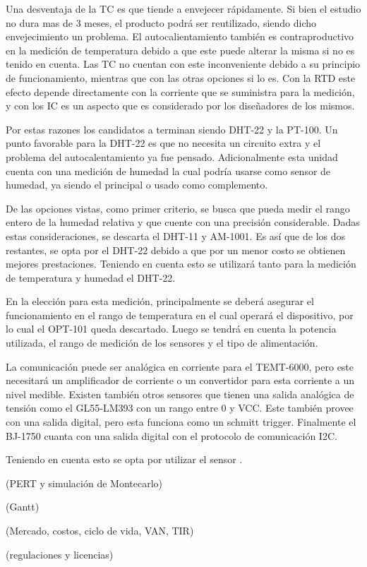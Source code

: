 Una desventaja de la TC es que tiende a envejecer rápidamente. Si bien el estudio no dura mas de 3 meses, el producto podrá ser reutilizado, siendo dicho envejecimiento un problema. El autocalientamiento también es contraproductivo en la medición de temperatura debido a que este puede alterar la misma si no es tenido en cuenta. Las TC no cuentan con este inconveniente debido a su principio de funcionamiento, mientras que con las otras opciones si lo es. Con la RTD este efecto depende directamente con la corriente que se suministra para la medición, y con los IC es un aspecto que es considerado por los diseñadores de los mismos.

Por estas razones los candidatos a terminan siendo DHT-22 y la PT-100. Un punto favorable para la DHT-22 es que no necesita un circuito extra y el problema del autocalentamiento ya fue pensado. Adicionalmente esta unidad cuenta con una medición de humedad la cual podría usarse como sensor de humedad, ya siendo el principal o usado como complemento.

De las opciones vistas, como primer criterio, se busca que pueda medir el rango entero de la humedad relativa y que cuente con una precisión considerable. Dadas estas consideraciones, se descarta el DHT-11 y AM-1001. Es así que de los dos restantes, se opta por el DHT-22 debido a que por un menor costo se obtienen mejores prestaciones. Teniendo en cuenta esto se utilizará tanto para la medición de temperatura y humedad el DHT-22.

En la elección para esta medición, principalmente se deberá asegurar el funcionamiento en el rango de temperatura en el cual operará el dispositivo, por lo cual el OPT-101 queda descartado. Luego se tendrá en cuenta la potencia utilizada, el rango de medición de los sensores y el tipo de alimentación.

La comunicación puede ser analógica en corriente para el TEMT-6000, pero este necesitará un amplificador de corriente o un convertidor para esta corriente a un nivel medible. Existen también otros sensores que tienen una salida analógica de tensión como el GL55-LM393 con un rango entre 0 y VCC. Este también provee con una salida digital, pero esta funciona como un schmitt trigger. Finalmente el BJ-1750 cuanta con una salida digital con el protocolo de comunicación I2C.

Teniendo en cuenta esto se opta por utilizar el sensor \TBD. 



(PERT y simulación de Montecarlo)

(Gantt)

(Mercado, costos, ciclo de vida, VAN, TIR)

(regulaciones y licencias)



